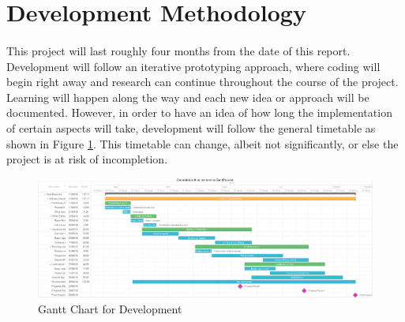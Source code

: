 \documentclass[11pt,titlepage]{report}
\begin{document}
\section{Development Methodology}
\paragraph{}
This project will last roughly four months from the date of this report. Development will follow an iterative prototyping approach, where coding will begin right away and research can continue throughout the course of the project. Learning will happen along the way and each new idea or approach will be documented. However, in order to have an idea of how long the implementation of certain aspects will take, development will follow the general timetable as shown in Figure \ref{fig:gantt}. This timetable can change, albeit not significantly, or else the project is at risk of incompletion.  
\begin{figure}[p]
\caption{Gantt Chart for Development}
\label{fig:gantt}
\centering
\includegraphics[scale=0.45, angle=90]{gantt}
\end{figure}



\end{document}
